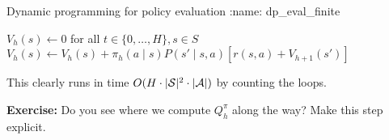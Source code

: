 \documentclass[\main/main]{subfiles}
\begin{document}
\begin{definition}{Dynamic programming for policy evaluation}
:name: dp_eval_finite

    \begin{algorithmic}
\State $V_h(s) \gets 0$ for all $t \in \{ 0, \dots, H \}, s \in S$
        \State $V_h(s) \gets V_h(s) + \pi_h(a \mid s) P(s' \mid s, a) [r(s, a) + V_{h+1}(s')]$
    \EndFor
\EndFor
    \end{algorithmic}
\end{definition}

This clearly runs in time $O(H \cdot |\mathcal{S}|^2 \cdot |\mathcal{A}|)$ by counting the loops.

\textbf{Exercise:} Do you see where we compute $Q^\pi_h$ along the way? Make this step explicit.
\end{document}
